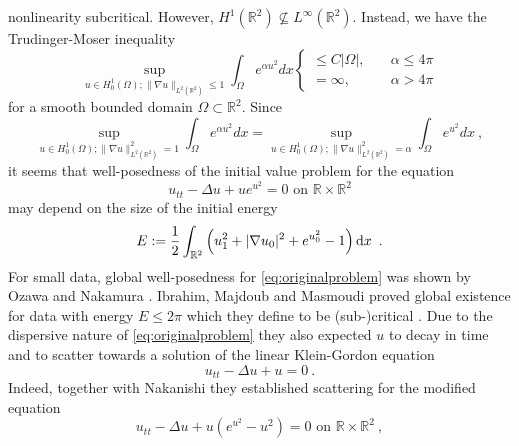 \documentclass[a4paper]{amsart}
\providecommand{\abs}[1]{\lvert #1 \rvert}
\providecommand{\dint}[1]{ {\rm d} #1\,}
\providecommand{\norm}[1]{\lVert #1 \rVert}
\begin{document}
nonlinearity subcritical. However, $H^1(\mathbb{R}^2)
\nsubseteq L^\infty(\mathbb{R}^2)$. Instead, we have
the Trudinger-Moser inequality
\begin{equation}
  \sup_{u \in H^1_0(\Omega); \norm{\nabla u}_{L^2(\mathbb{R}^2)} \leq 1}
  \int_{\Omega}
  e^{\alpha u^2}
  dx
  \begin{cases}
    \leq
    C \abs{\Omega}
    ,\quad
    &\alpha \leq 4 \pi
    \\
    =
    \infty
    ,\quad
    &\alpha > 4 \pi
  \end{cases}
  \label{eq:mosertrudinger}
\end{equation}
for a smooth bounded domain $\Omega \subset \mathbb{R}^2$.
Since
\begin{equation*}
  \sup_{u \in H^1_0(\Omega); \norm{\nabla u}_{L^2(\mathbb{R}^2)}^2 = 1}
  \int_{\Omega}
  e^{\alpha u^2}
  dx
  =
  \sup_{u \in H^1_0(\Omega); \norm{\nabla u}_{L^2(\mathbb{R}^2)}^2 = \alpha}
  \int_{\Omega}
  e^{u^2}
  dx
  \ ,
\end{equation*}
it seems that well-posedness of the initial value problem for the
equation
\begin{equation}
  u_{tt} - {\Delta} u
  +
  u e^{u^2}
  =
  0
  \text{ on }
  {\mathbb{R}} \times {\mathbb{R}}^2
  \label{eq:originalproblem}
\end{equation}
may depend on the size of the initial energy
\begin{equation*}
  E
  :=
  \frac{1}{2}
  \int_{{\mathbb{R}}^2}
  \left(
  u_1^2
  +
  \abs{\nabla u_0}^2
  +
  e^{u_0^2} - 1
  \right)
  \dint{x}
  \ .
\end{equation*}
For small data, global well-posedness for \eqref{eq:originalproblem} was
shown by Ozawa and Nakamura \cite{MR1704989}. Ibrahim, Majdoub and
Masmoudi proved global existence for data with energy $E \leq 2 \pi$
which they define to be (sub-)critical \cite{MR2254447}. Due
to the dispersive nature of \eqref{eq:originalproblem} they also
expected $u$ to decay in time and to scatter towards a solution of the
linear Klein-Gordon equation
\begin{equation}
  u_{tt} - {\Delta} u + u
  =
  0\ .
  \label{eq:linearkleingordon}
\end{equation}
Indeed, together with Nakanishi \cite{MR2569615} they established scattering for the
modified equation
\begin{equation}
  u_{tt} - {\Delta} u
  +
  u
  \left(
  e^{u^2} - u^2
  \right)
  =
  0
  \text{ on }
  {\mathbb{R}} \times {\mathbb{R}}^2
  \ ,
  \label{eq:nleq}
\end{equation}
\end{document}
